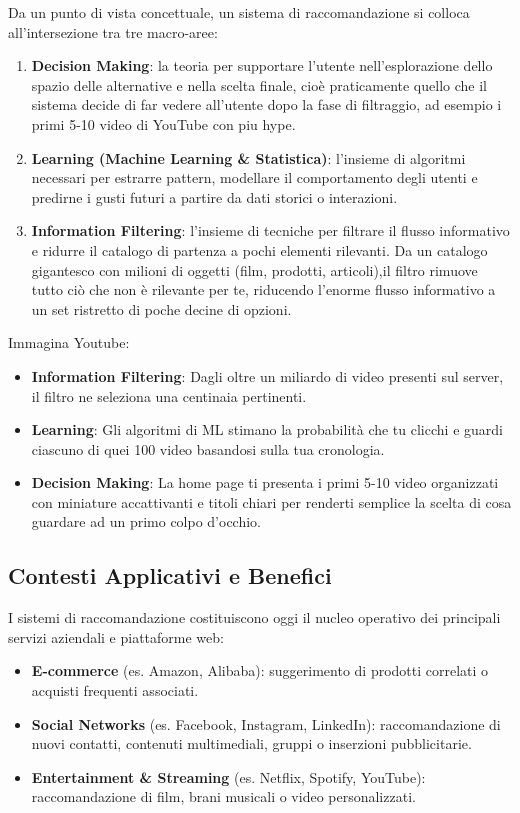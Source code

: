 Da un punto di vista concettuale, un sistema di raccomandazione si colloca all'intersezione tra tre macro-aree:
\begin{enumerate}
    \item \textbf{Decision Making}: la teoria per supportare l'utente nell'esplorazione dello spazio delle alternative e nella scelta finale, cioè praticamente quello che il sistema decide di far vedere all'utente dopo la fase di filtraggio, ad esempio i primi 5-10 video di YouTube con piu hype.
    \item \textbf{Learning (Machine Learning \& Statistica)}: l'insieme di algoritmi necessari per estrarre pattern, modellare il comportamento degli utenti e predirne i gusti futuri a partire da dati storici o interazioni.
    \item \textbf{Information Filtering}: l'insieme di tecniche per filtrare il flusso informativo e ridurre il catalogo di partenza a pochi elementi rilevanti.
    Da un catalogo gigantesco con milioni di oggetti (film, prodotti, articoli),il filtro rimuove tutto ciò che non è rilevante per te, riducendo l'enorme flusso informativo a un set ristretto di poche decine di opzioni.
\end{enumerate}

Immagina Youtube:
\begin{itemize}
    \item \textbf{Information Filtering}: Dagli oltre un miliardo di video presenti sul server, il filtro ne seleziona una centinaia pertinenti.   
    \item \textbf{Learning}: Gli algoritmi di ML stimano la probabilità che tu clicchi e guardi ciascuno di quei 100 video basandosi sulla tua cronologia.   
    \item \textbf{Decision Making}: La home page ti presenta i primi 5-10 video organizzati con miniature accattivanti e titoli chiari per renderti semplice la scelta di cosa guardare ad un primo colpo d'occhio.
\end{itemize}

\subsection{Contesti Applicativi e Benefici}
I sistemi di raccomandazione costituiscono oggi il nucleo operativo dei principali servizi aziendali e piattaforme web:
\begin{itemize}
    \item \textbf{E-commerce} (es. Amazon, Alibaba): suggerimento di prodotti correlati o acquisti frequenti associati.
    \item \textbf{Social Networks} (es. Facebook, Instagram, LinkedIn): raccomandazione di nuovi contatti, contenuti multimediali, gruppi o inserzioni pubblicitarie.
    \item \textbf{Entertainment \& Streaming} (es. Netflix, Spotify, YouTube): raccomandazione di film, brani musicali o video personalizzati.
\end{itemize}

